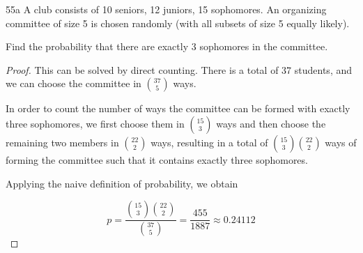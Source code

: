 \begin{exercise}{55a}
    A club consists of 10 seniors, 12 juniors, 15 sophomores. An organizing committee of size 5 is chosen randomly (with all subsets of size 5 equally likely).

    Find the probability that there are exactly 3 sophomores in the committee.
\end{exercise}

\begin{proof}
    This can be solved by direct counting. There is a total of 37 students, and we can choose the committee in $37 \choose 5$ ways.

    In order to count the number of ways the committee can be formed with exactly three sophomores, we first choose them in $15 \choose 3$ ways and then choose the remaining two members in $22 \choose 2$ ways, resulting in a total of ${15 \choose 3}{22 \choose 2}$ ways of forming the committee such that it contains exactly three sophomores.

    Applying the naive definition of probability, we obtain

    $$p = \frac{ {15 \choose 3}{22 \choose 2}}{ {37 \choose 5}} = \frac{455}{1887} \approx 0.24112$$
\end{proof}

